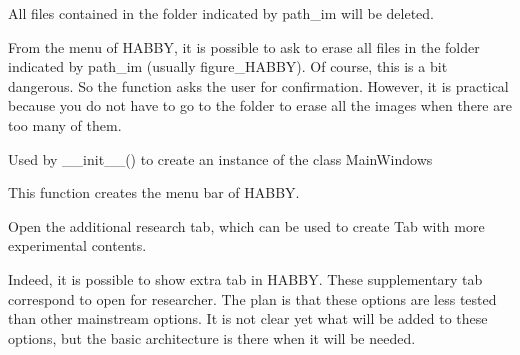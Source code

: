 \documentclass[letterpaper,10pt,english]{sphinxmanual}
\begin{document}
\begin{fulllineitems}
\begin{fulllineitems}
\begin{itemize}
\end{itemize}

\end{fulllineitems}


\begin{fulllineitems}
\label{\detokenize{index:src_GUI.Main_windows_1.MainWindows.erase_pict}}
All files contained in the folder indicated by path\_im will be deleted.

From the menu of HABBY, it is possible to ask to erase all files in the folder indicated by path\_im
(usually figure\_HABBY). Of course, this is a bit dangerous. So the function asks the user for confirmation.
However, it is practical because you do not have to go to the folder to erase all the images when there
are too many of them.

\end{fulllineitems}


\begin{fulllineitems}
\label{\detokenize{index:src_GUI.Main_windows_1.MainWindows.init_ui}}
Used by \_\_init\_\_() to create an instance of the class MainWindows

\end{fulllineitems}


\begin{fulllineitems}
\label{\detokenize{index:src_GUI.Main_windows_1.MainWindows.my_menu_bar}}
This function creates the menu bar of HABBY.

\end{fulllineitems}


\begin{fulllineitems}
\label{\detokenize{index:src_GUI.Main_windows_1.MainWindows.open_rech}}
Open the additional research tab, which can be used to create Tab with more experimental contents.

Indeed, it is possible to show extra tab in HABBY. These supplementary tab correspond to open for researcher.
The plan is that these options are less tested than other mainstream options. It is not clear yet what
will be added to these options, but the basic architecture is there when it will be needed.


\end{fulllineitems}
\end{fulllineitems}
\end{document}
